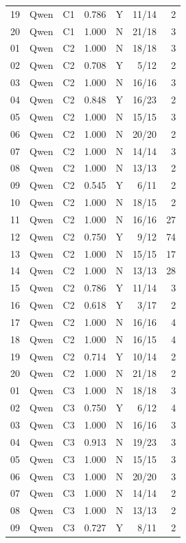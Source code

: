 \begin{longtable}{llrrlrr}
    19 & Qwen & C1 & 0.786 & Y & 11/14 & 2 \\
    20 & Qwen & C1 & 1.000 & N & 21/18 & 3 \\
    01 & Qwen & C2 & 1.000 & N & 18/18 & 3 \\
    02 & Qwen & C2 & 0.708 & Y & 5/12 & 2 \\
    03 & Qwen & C2 & 1.000 & N & 16/16 & 3 \\
    04 & Qwen & C2 & 0.848 & Y & 16/23 & 2 \\
    05 & Qwen & C2 & 1.000 & N & 15/15 & 3 \\
    06 & Qwen & C2 & 1.000 & N & 20/20 & 2 \\
    07 & Qwen & C2 & 1.000 & N & 14/14 & 3 \\
    08 & Qwen & C2 & 1.000 & N & 13/13 & 2 \\
    09 & Qwen & C2 & 0.545 & Y & 6/11 & 2 \\
    10 & Qwen & C2 & 1.000 & N & 18/15 & 2 \\
    11 & Qwen & C2 & 1.000 & N & 16/16 & 27 \\
    12 & Qwen & C2 & 0.750 & Y & 9/12 & 74 \\
    13 & Qwen & C2 & 1.000 & N & 15/15 & 17 \\
    14 & Qwen & C2 & 1.000 & N & 13/13 & 28 \\
    15 & Qwen & C2 & 0.786 & Y & 11/14 & 3 \\
    16 & Qwen & C2 & 0.618 & Y & 3/17 & 2 \\
    17 & Qwen & C2 & 1.000 & N & 16/16 & 4 \\
    18 & Qwen & C2 & 1.000 & N & 16/15 & 4 \\
    19 & Qwen & C2 & 0.714 & Y & 10/14 & 2 \\
    20 & Qwen & C2 & 1.000 & N & 21/18 & 2 \\
    01 & Qwen & C3 & 1.000 & N & 18/18 & 3 \\
    02 & Qwen & C3 & 0.750 & Y & 6/12 & 4 \\
    03 & Qwen & C3 & 1.000 & N & 16/16 & 3 \\
    04 & Qwen & C3 & 0.913 & N & 19/23 & 3 \\
    05 & Qwen & C3 & 1.000 & N & 15/15 & 3 \\
    06 & Qwen & C3 & 1.000 & N & 20/20 & 3 \\
    07 & Qwen & C3 & 1.000 & N & 14/14 & 2 \\
    08 & Qwen & C3 & 1.000 & N & 13/13 & 2 \\
    09 & Qwen & C3 & 0.727 & Y & 8/11 & 2 \\

\end{longtable}
